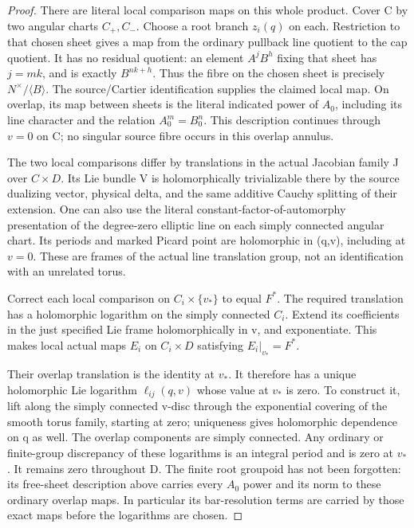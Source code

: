 \begin{proof}
There are literal local comparison maps on this whole product.
Cover C by two angular charts \(C_+,C_-\). Choose a root branch \(z_i(q)\)
on each. Restriction to that chosen sheet gives a map from the
ordinary pullback line quotient to the cap quotient. It has no
residual quotient: an element \(A^jB^h\) fixing that sheet has
\(j=mk\), and is exactly \(B^{nk+h}\). Thus the fibre on the
chosen sheet is precisely \(N^\times/\langle B\rangle\).
The source/Cartier identification supplies the claimed local map.
On overlap, its map between sheets is the literal indicated power
of \(A_0\), including its line character and the relation \(A_0^m=B_0^n\).
This description continues through \(v=0\) on C; no singular source
fibre occurs in this overlap annulus.

The two local comparisons differ by translations in the actual
Jacobian family J over \(C\times D\). Its Lie bundle V is holomorphically
trivializable there by the source dualizing vector, physical delta,
and the same additive Cauchy splitting of their extension. One can
also use the literal constant-factor-of-automorphy presentation of
the degree-zero elliptic line on each simply connected angular
chart. Its periods and marked Picard point are holomorphic in
(q,v), including at \(v=0\). These are frames of the actual line
translation group, not an identification with an unrelated torus.

Correct each local comparison on \(C_i\times\{v_*\}\) to equal \(F^*\). The required
translation has a holomorphic logarithm on the simply connected
\(C_i\). Extend its coefficients in the just specified Lie frame
holomorphically in v, and exponentiate. This makes local actual
maps \(E_i\) on \(C_i\times D\) satisfying \(E_i|_{v_*}=F^*\).

Their overlap translation is the identity at \(v_*\). It therefore has
a unique holomorphic Lie logarithm \(\ell_{ij}(q,v)\) whose value
at \(v_*\) is zero. To construct it, lift along the simply connected
v-disc through the exponential covering of the smooth torus
family, starting at zero; uniqueness gives holomorphic dependence
on q as well. The overlap components are simply connected. Any
ordinary or finite-group discrepancy of these logarithms is an
integral period and is zero at \(v_*\). It remains zero throughout D.
The finite root groupoid has not been forgotten: its free-sheet
description above carries every \(A_0\) power and its norm to these
ordinary overlap maps. In particular its bar-resolution terms are
carried by those exact maps before the logarithms are chosen.


\end{proof}

